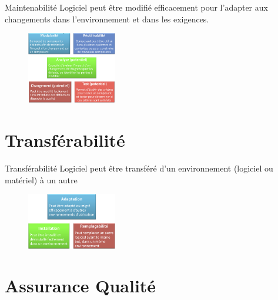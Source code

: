 \documentclass[16pt]{report}
\begin{document}
\begin{multicols*}{2}
        \begin{Concept}{Maintenabilité}{}
            Logiciel peut être modifié efficacement pour l’adapter aux changements dans
            l’environnement et dans les exigences.
        \end{Concept}


        


        \begin{figure}[H]
            \begin{center}
                \includegraphics[width=0.35\textwidth]{cap7.png}
            \end{center}
        \end{figure}


        \section{Transférabilité}
        
        \begin{Concept}{Transférabilité}{}
            Logiciel peut être transféré d’un environnement (logiciel ou matériel) à un autre
        \end{Concept}



        \begin{figure}[H]
            \begin{center}
                \includegraphics[width=0.35\textwidth]{cap8.png}
            \end{center}
        \end{figure}

        \section{Assurance Qualité}



\end{multicols*}
\end{document}
